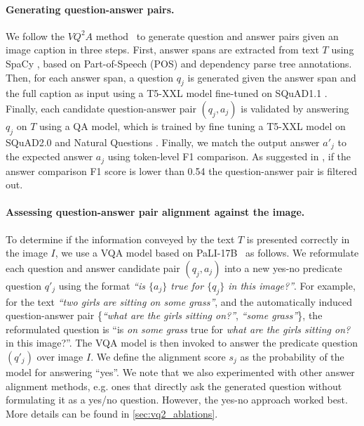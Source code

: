 \documentclass{article}
\begin{document}
\paragraph{Generating question-answer pairs.}

We follow the $VQ^{2}A$ method~\citep{changpinyo2022all} to generate question and answer pairs given an image caption in three steps. First, answer spans are extracted from text $T$ using SpaCy \cite{spacy2}, based on Part-of-Speech (POS) and dependency parse tree annotations. Then, for each answer span, a question $q_j$ is generated given the answer span and the full caption as input using a T5-XXL model fine-tuned on SQuAD1.1 \citep{rajpurkar-etal-2016-squad}. 
Finally, each candidate question-answer pair $(q_j,a_j)$ is validated by answering $q_j$ on $T$ using a QA model, which is trained by fine tuning a T5-XXL model on SQuAD2.0 \citep{rajpurkar-etal-2018-know} and Natural Questions \citep{kwiatkowski-etal-2019-natural}. Finally, we match the output answer $a'_j$ to the expected answer $a_j$ using token-level F1 comparison. As suggested in \cite{changpinyo2022all}, if the answer comparison F1 score is lower than 0.54 the question-answer pair is filtered out.

\paragraph{Assessing question-answer pair alignment against the image.}\label{ascessing_qa_alignment}
To determine if the information conveyed by the text $T$ is presented correctly in the image $I$, we use a VQA model based on PaLI-17B~\citep{pali2} as follows. We reformulate each question and answer candidate pair $(q_j, a_j)$ into a new yes-no predicate question $q'_j$ using the format \textit{``is $\{a_j\}$ true for $\{q_j\}$ in this image?''}. For example, for the text \textit{``two girls are sitting on some grass''}, and the automatically induced question-answer pair \{\textit{``what are the girls sitting on?''}, \textit{``some grass''}\}, the reformulated question is ``is \textit{on some grass} true for \textit{what are the girls sitting on?} in this image?''.
The VQA model is then invoked to answer the predicate question $(q'_j)$ over image $I$. We define the alignment score $s_j$ as the probability of the model for answering ``yes''. We note that we also experimented with other answer alignment methods, e.g. ones that directly ask the generated question without formulating it as a yes/no question. However, the yes-no approach worked best. More details can be found in \cref{sec:vq2_ablations}.
\end{document}
